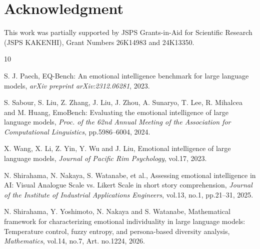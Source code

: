 \documentclass[12pt,a4paper]{icicel}
\begin{document}
\section*{Acknowledgment}
This work was partially supported by JSPS Grants-in-Aid for Scientific
Research (JSPS KAKENHI), Grant Numbers 26K14983 and 24K13350.

\begin{thebibliography}{10}

S. J. Paech, EQ-Bench: An emotional intelligence benchmark for large language
models, {\em arXiv preprint arXiv:2312.06281}, 2023.

S. Sabour, S. Liu, Z. Zhang, J. Liu, J. Zhou, A. Sunaryo, T. Lee,
R. Mihalcea and M. Huang, EmoBench: Evaluating the emotional intelligence of
large language models, {\em Proc. of the 62nd Annual Meeting of the Association
for Computational Linguistics}, pp.5986--6004, 2024.

X. Wang, X. Li, Z. Yin, Y. Wu and J. Liu, Emotional intelligence of large
language models, {\em Journal of Pacific Rim Psychology}, vol.17, 2023.

N. Shirahama, N. Nakaya, S. Watanabe, et al., Assessing emotional intelligence
in AI: Visual Analogue Scale vs. Likert Scale in short story comprehension,
{\em Journal of the Institute of Industrial Applications Engineers}, vol.13,
no.1, pp.21--31, 2025.

N. Shirahama, Y. Yoshimoto, N. Nakaya and S. Watanabe, Mathematical framework
for characterizing emotional individuality in large language models:
Temperature control, fuzzy entropy, and persona-based diversity analysis,
{\em Mathematics}, vol.14, no.7, Art. no.1224, 2026.

\end{thebibliography}
\end{document}
